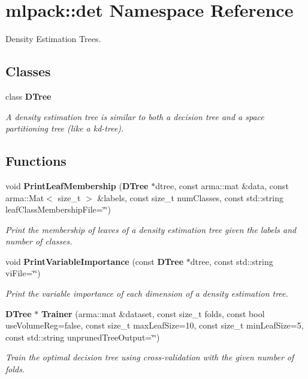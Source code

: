 \section{mlpack\-:\-:det Namespace Reference}
\label{namespacemlpack_1_1det}


Density Estimation Trees.  


\subsection*{Classes}
\begin{DoxyCompactItemize}
\item 
class {\bf D\-Tree}
\begin{DoxyCompactList}\small\item\em A density estimation tree is similar to both a decision tree and a space partitioning tree (like a kd-\/tree). \end{DoxyCompactList}\end{DoxyCompactItemize}
\subsection*{Functions}
\begin{DoxyCompactItemize}
\item 
void {\bf Print\-Leaf\-Membership} ({\bf D\-Tree} $\ast$dtree, const arma\-::mat \&data, const arma\-::\-Mat$<$ size\-\_\-t $>$ \&labels, const size\-\_\-t num\-Classes, const std\-::string leaf\-Class\-Membership\-File=\char`\"{}\char`\"{})
\begin{DoxyCompactList}\small\item\em Print the membership of leaves of a density estimation tree given the labels and number of classes. \end{DoxyCompactList}\item 
void {\bf Print\-Variable\-Importance} (const {\bf D\-Tree} $\ast$dtree, const std\-::string vi\-File=\char`\"{}\char`\"{})
\begin{DoxyCompactList}\small\item\em Print the variable importance of each dimension of a density estimation tree. \end{DoxyCompactList}\item 
{\bf D\-Tree} $\ast$ {\bf Trainer} (arma\-::mat \&dataset, const size\-\_\-t folds, const bool use\-Volume\-Reg=false, const size\-\_\-t max\-Leaf\-Size=10, const size\-\_\-t min\-Leaf\-Size=5, const std\-::string unpruned\-Tree\-Output=\char`\"{}\char`\"{})
\begin{DoxyCompactList}\small\item\em Train the optimal decision tree using cross-\/validation with the given number of folds. \end{DoxyCompactList}\end{DoxyCompactItemize}


